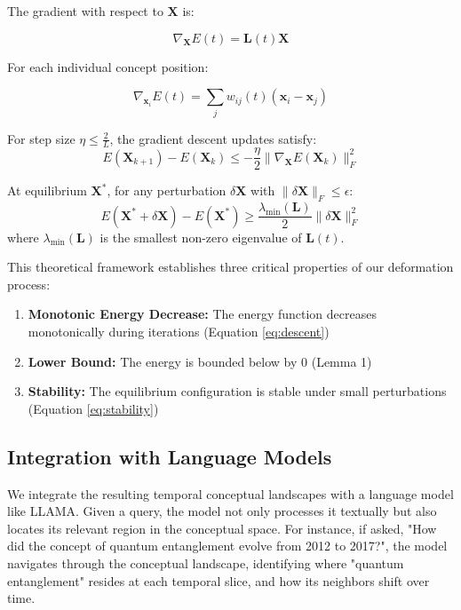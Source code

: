 \documentclass{article}
\begin{document}
The gradient with respect to $\mathbf{X}$ is:

\begin{equation}
\nabla_\mathbf{X}E(t) = \mathbf{L}(t)\mathbf{X}
\label{eq:gradient}
\end{equation}

For each individual concept position:

\begin{equation}
\nabla_{\mathbf{x}_i}E(t) = \sum_j w_{ij}(t)(\mathbf{x}_i - \mathbf{x}_j)
\label{eq:position_gradient}
\end{equation}

\begin{lemma}
For step size $\eta \leq \frac{2}{L}$, the gradient descent updates satisfy:
\begin{equation}
E(\mathbf{X}_{k+1}) - E(\mathbf{X}_k) \leq -\frac{\eta}{2}\|\nabla_\mathbf{X}E(\mathbf{X}_k)\|_F^2
\label{eq:descent}
\end{equation}
\end{lemma}

\begin{theorem}[Stability]
At equilibrium $\mathbf{X}^*$, for any perturbation $\delta\mathbf{X}$ with $\|\delta\mathbf{X}\|_F \leq \epsilon$:
\begin{equation}
E(\mathbf{X}^* + \delta\mathbf{X}) - E(\mathbf{X}^*) \geq \frac{\lambda_{\min}(\mathbf{L})}{2}\|\delta\mathbf{X}\|_F^2
\label{eq:stability}
\end{equation}
where $\lambda_{\min}(\mathbf{L})$ is the smallest non-zero eigenvalue of $\mathbf{L}(t)$.
\end{theorem}

This theoretical framework establishes three critical properties of our deformation process:

\begin{enumerate}
    \item \textbf{Monotonic Energy Decrease:} The energy function decreases monotonically during iterations (Equation \ref{eq:descent})
    \item \textbf{Lower Bound:} The energy is bounded below by 0 (Lemma 1)
    \item \textbf{Stability:} The equilibrium configuration is stable under small perturbations (Equation \ref{eq:stability})
\end{enumerate}

\subsection{Integration with Language Models}
We integrate the resulting temporal conceptual landscapes with a language model like LLAMA. Given a query, the model not only processes it textually but also locates its relevant region in the conceptual space. For instance, if asked, "How did the concept of quantum entanglement evolve from 2012 to 2017?", the model navigates through the conceptual landscape, identifying where "quantum entanglement" resides at each temporal slice, and how its neighbors shift over time.
\end{document}
